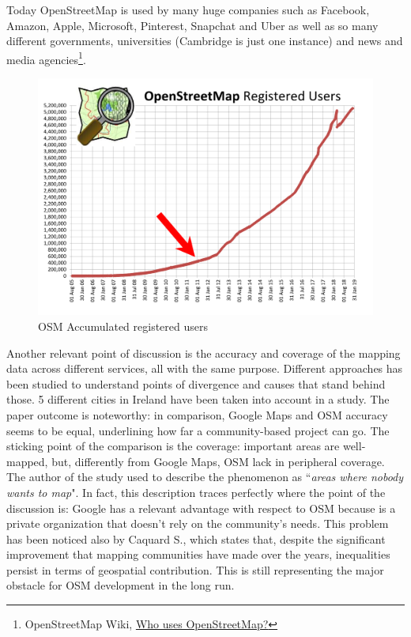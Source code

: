 Today OpenStreetMap is used by many huge companies such as Facebook, Amazon, Apple, Microsoft, Pinterest, Snapchat and Uber as well as so many different governments, universities (Cambridge is just one instance) and news and media agencies\footnote{OpenStreetMap Wiki, \href{https://welcome.openstreetmap.org/about-osm-community/consumers/}{Who uses OpenStreetMap?}}.

\begin{figure}
    \centering
    \includegraphics[width=0.9\linewidth]{images/osm_registered_users.png}
    \caption{OSM Accumulated registered users}
    \label{fig:osm_users}
\end{figure}

Another relevant point of discussion is the accuracy and coverage of the mapping data across different services, all with the same purpose. Different approaches has been studied to understand points of divergence and causes that stand behind those. 5 different cities in Ireland have been taken into account in a study\cite{ciepluch2010comparison}. The paper outcome is noteworthy: in comparison, Google Maps and OSM accuracy seems to be equal, underlining how far a community-based project can go. The sticking point of the comparison is the coverage: important areas are well-mapped, but, differently
from Google Maps, OSM lack in peripheral coverage.
The author of the study used to describe the phenomenon as ``\textit{areas where nobody wants to map}". In fact, this description traces perfectly where the point of the discussion is: Google has a relevant advantage with respect to OSM because is a private organization that doesn't rely on the community's needs.
This problem has been noticed also by Caquard S.\cite{caquard2014cartographyII}, which states that, despite the significant improvement that mapping communities have made over the years, inequalities persist in terms of geospatial contribution.
This is still representing the major obstacle for OSM development in the long run.

